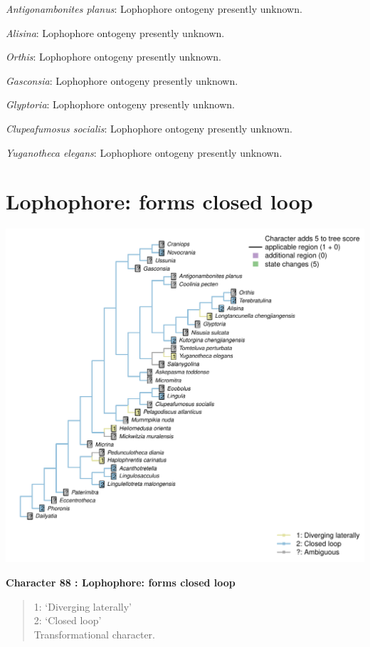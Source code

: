 \documentclass[]{book}
\theoremstyle{definition}
\theoremstyle{definition}
\theoremstyle{definition}
\theoremstyle{remark}
\begin{document}
\emph{Antigonambonites planus}: Lophophore ontogeny presently unknown.

\emph{Alisina}: Lophophore ontogeny presently unknown.

\emph{Orthis}: Lophophore ontogeny presently unknown.

\emph{Gasconsia}: Lophophore ontogeny presently unknown.

\emph{Glyptoria}: Lophophore ontogeny presently unknown.

\emph{Clupeafumosus socialis}: Lophophore ontogeny presently unknown.

\emph{Yuganotheca elegans}: Lophophore ontogeny presently unknown.

\hypertarget{lophophore-forms-closed-loop}{%
\section*{Lophophore: forms closed
loop}\label{lophophore-forms-closed-loop}}

\includegraphics{Brachiopod_phylogeny_files/figure-latex/unnamed-chunk-5-88.pdf}

\textbf{Character 88 : Lophophore: forms closed loop }

\begin{quote}
1: `Diverging laterally'\\
2: `Closed loop'\\
Transformational character.
\end{quote}
\end{document}
